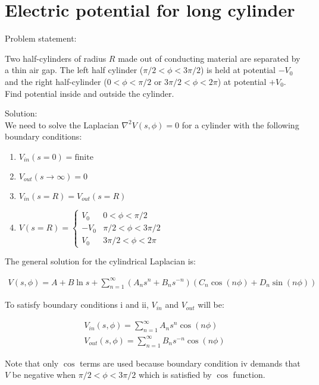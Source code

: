 \documentclass[12pt, a4paper]{article}
\begin{document}
\section{Electric potential for long cylinder}

Problem statement:

\begin{displayquote}
Two half-cylinders of radius $R$ made out of conducting material are separated by a thin air gap. The left half cylinder ($\pi/2 < \phi < 3\pi/2$) is held at potential $-V_0$ and the right half-cylinder ($0 < \phi < \pi/2$ or $3\pi/2 < \phi < 2\pi$) at potential $+V_0$. Find potential inside and outside the cylinder.
\end{displayquote}

Solution: \\

We need to solve the Laplacian $\nabla^2 V(s, \phi)=0$ for a cylinder with the following boundary conditions:

\begin{enumerate}[i]
  \item $V_{in}(s=0)=\text{finite}$
  \item $V_{out}(s \rightarrow \infty) = 0$
  \item $V_{in} (s=R) = V_{out} (s=R)$
  \item $V(s=R)=\begin{cases} V_0 & 0 < \phi < \pi/2 \\ -V_0 & \pi/2 < \phi < 3\pi/2 \\ V_0 & 3\pi/2 < \phi < 2\pi \end{cases}$
\end{enumerate}

The general solution for the cylindrical Laplacian is:

\begin{gather}
V (s, \phi) = A + B \ln s + \sum_{n=1}^\infty \left( A_n s^n + B_n s^{-n} \right) \left( C_n \cos (n\phi) + D_n \sin (n\phi) \right)
\end{gather}

To satisfy boundary conditions i and ii, $V_{in}$ and $V_{out}$ will be:

\begin{gather}
V_{in} (s, \phi) = \sum_{n=1}^\infty A_n s^n \cos (n\phi) \\
V_{out} (s, \phi) = \sum_{n=1}^\infty B_n s^{-n} \cos (n\phi)
\end{gather}

Note that only $\cos$ terms are used because boundary condition iv demands that $V$ be negative when $\pi/2 < \phi < 3\pi/2$ which is satisfied by $\cos$ function. \\
\end{document}
